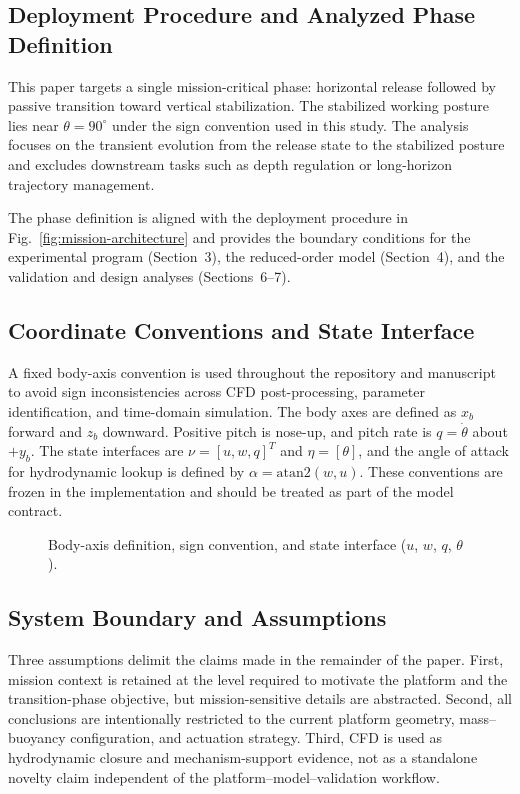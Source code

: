 \subsection{Deployment Procedure and Analyzed Phase Definition}

This paper targets a single mission-critical phase: horizontal release followed by passive transition toward vertical stabilization. The stabilized working posture lies near $\theta=90^\circ$ under the sign convention used in this study. The analysis focuses on the transient evolution from the release state to the stabilized posture and excludes downstream tasks such as depth regulation or long-horizon trajectory management.

The phase definition is aligned with the deployment procedure in Fig.~\ref{fig:mission-architecture} and provides the boundary conditions for the experimental program (Section~3), the reduced-order model (Section~4), and the validation and design analyses (Sections~6--7).

\subsection{Coordinate Conventions and State Interface}

A fixed body-axis convention is used throughout the repository and manuscript to avoid sign inconsistencies across CFD post-processing, parameter identification, and time-domain simulation. The body axes are defined as $x_b$ forward and $z_b$ downward. Positive pitch is nose-up, and pitch rate is $q=\dot{\theta}$ about $+y_b$. The state interfaces are $\nu=[u,w,q]^T$ and $\eta=[\theta]$, and the angle of attack for hydrodynamic lookup is defined by $\alpha=\mathrm{atan2}(w,u)$. These conventions are frozen in the implementation and should be treated as part of the model contract.

\begin{figure}[htbp]
  \centering
  \caption{Body-axis definition, sign convention, and state interface ($u$, $w$, $q$, $\theta$).}
  \label{fig:conventions}
\end{figure}

\subsection{System Boundary and Assumptions}

Three assumptions delimit the claims made in the remainder of the paper. First, mission context is retained at the level required to motivate the platform and the transition-phase objective, but mission-sensitive details are abstracted. Second, all conclusions are intentionally restricted to the current platform geometry, mass--buoyancy configuration, and actuation strategy. Third, CFD is used as hydrodynamic closure and mechanism-support evidence, not as a standalone novelty claim independent of the platform--model--validation workflow.

